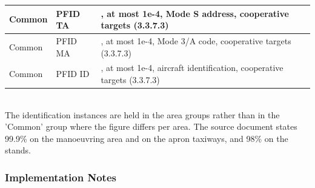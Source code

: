 \begin{center}
\begin{table}[H]
\begin{tabularx}{\textwidth}{ | l | l | X | }
    Common & PFID TA & \nameref{sec:eval_req_id_false}, at most 1e-4, Mode S address, cooperative targets (3.3.7.3) \\ \hline
    Common & PFID MA & \nameref{sec:eval_req_id_false}, at most 1e-4, Mode 3/A code, cooperative targets (3.3.7.3) \\ \hline
    Common & PFID ID & \nameref{sec:eval_req_id_false}, at most 1e-4, aircraft identification, cooperative targets (3.3.7.3) \\ \hline
\end{tabularx}
\end{table}
\end{center}
\ \\

The identification instances are held in the area groups rather than in the 'Common' group where the figure differs per area. The source document states 99.9\% on the manoeuvring area and on the apron taxiways, and 98\% on the stands. \\

\subsubsection{Implementation Notes}

